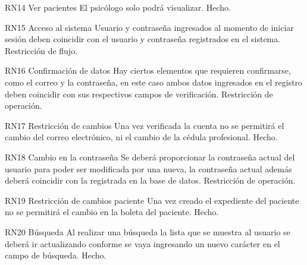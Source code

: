 \begin{BussinesRule}{RN14}{ Ver pacientes}
\BRitem[Descripción:] El psicólogo solo podrá visualizar.
\BRitem[Tipo:] Hecho.
\end{BussinesRule}

\begin{BussinesRule}{RN15}{ Acceso al sistema}
\BRitem[Descripción: ]  Usuario y contraseña ingresados al momento de iniciar sesión deben coincidir con el usuario y contraseña registrados en el sistema.
\BRitem[Tipo:] Restricción de flujo.
\end{BussinesRule}

\begin{BussinesRule}{RN16}{ Confirmación de datos}
\BRitem[Descripción:] Hay ciertos elementos que requieren confirmarse, como el correo y la contraseña, en este caso ambos datos ingresados en el registro deben coincidir con sus respectivos campos de verificación.
\BRitem[Tipo:] Restricción de operación.
\end{BussinesRule}

\begin{BussinesRule}{RN17}{ Restricción de cambios}
\BRitem[Descripción: ]  Una vez verificada la cuenta no se permitirá el cambio del correo electrónico, ni el cambio de la cédula profesional.
\BRitem[Tipo:] Hecho.
\end{BussinesRule}

\begin{BussinesRule}{RN18}{ Cambio en la contraseña}
\BRitem[Descripción: ]  Se deberá proporcionar la contraseña actual del usuario para poder ser modificada por una nueva, la contraseña actual además deberá coincidir con la registrada en la base de datos.
\BRitem[Tipo:] Restricción de operación.
\end{BussinesRule}

\begin{BussinesRule}{RN19}{ Restricción de cambios paciente}
\BRitem[Descripción: ]  Una vez creado el expediente del paciente no se permitirá el cambio en la boleta del paciente.
\BRitem[Tipo:] Hecho.
\end{BussinesRule}

\begin{BussinesRule}{RN20}{ Búsqueda}
\BRitem[Descripción:] Al realizar una búsqueda la lista que se muestra al usuario se deberá ir actualizando conforme se vaya ingresando un nuevo carácter en el campo de búsqueda.
\BRitem[Tipo:] Hecho.
\end{BussinesRule}


